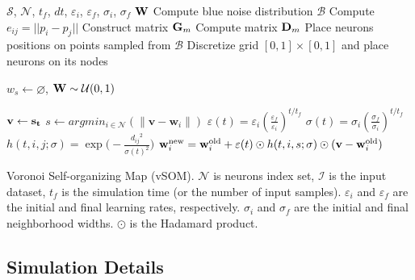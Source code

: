 \begin{algorithm}[!htpb]
	\begin{algorithmic}
    	\Require $\mathcal{S}$, $\mathcal{N}$, $t_f$, $dt$, $\varepsilon_i$, $\varepsilon_f$, $\sigma_i$, $\sigma_f$
        \Ensure ${\bf W}$
        	\State Compute blue noise distribution $\mathcal{B}$
        	\State Compute $e_{ij} = || p_i - p_j ||$		
        	\State Construct matrix ${\bf G}_m$			
        	\State Compute matrix ${\bf D}_m$			
        	\State Place neurons positions on points sampled from $\mathcal{B}$
        \Else
        	\State Discretize grid $[0, 1]\times[0, 1]$ and place neurons on its nodes
        \EndIf
        
        \State $w_s \gets \varnothing$, ${\bf W} \sim \mathcal{U}(0, 1)$	
                 
        	\State ${\bf v} \gets \bf{s}_t $	
        	\State $s \gets argmin_{i \in \mathcal{N}} (\lVert \mathbf{v} - \mathbf{w}_i \rVert)$
        	\State $\varepsilon(t) = \varepsilon_i\left(\frac{\varepsilon_f}{\varepsilon_i}\right)^{t/t_f}$
        	\State $\sigma(t) = \sigma_i\left(\frac{\sigma_f}{\sigma_i}\right)^{t/t_f}$
        	\State $h(t,i,j; \sigma) = \exp\Big(-\frac{{d_{ij}}^2}{\sigma(t)^2}\Big)$
        	\State ${\bf w}_i^{\text{new}} = {\bf w}_i^{\text{old}} + \varepsilon(t) \odot h(t,i,s;\sigma) \odot (\mathbf{v} - \mathbf{w}_i^{\text{old}})$
        \EndFor
	\end{algorithmic}
\caption{Voronoi Self-organizing Map (vSOM). $\mathcal{N}$ is neurons index set,
$\mathcal{I}$ is the input dataset, $t_f$ is the simulation time (or the number of input samples).
$\varepsilon_i$ and $\varepsilon_f$ are the initial and final learning rates,
respectively. $\sigma_i$ and $\sigma_f$ are the initial and final neighborhood
widths. $\odot$ is the Hadamard product.}
\label{algo:vsom}
\end{algorithm}



\subsection{Simulation Details}

